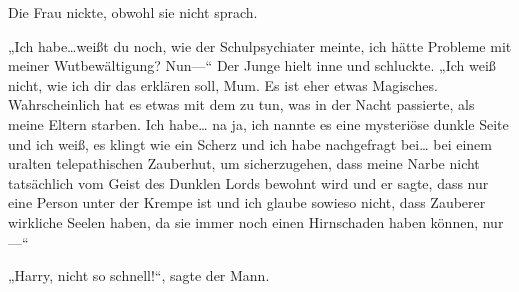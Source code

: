 Die Frau nickte, obwohl sie nicht sprach.

„Ich habe…weißt du noch, wie der Schulpsychiater meinte, ich hätte Probleme mit meiner Wutbewältigung? Nun—“ Der Junge hielt inne und schluckte. „Ich weiß nicht, wie ich dir das erklären soll, Mum. Es ist eher etwas Magisches. Wahrscheinlich hat es etwas mit dem zu tun, was in der Nacht passierte, als meine Eltern starben. Ich habe… na ja, ich nannte es eine mysteriöse dunkle Seite und ich weiß, es klingt wie ein Scherz und ich habe nachgefragt bei… bei einem uralten telepathischen Zauberhut, um sicherzugehen, dass meine Narbe nicht tatsächlich vom Geist des Dunklen Lords bewohnt wird und er sagte, dass nur eine Person unter der Krempe ist und ich glaube sowieso nicht, dass Zauberer wirkliche Seelen haben, da sie immer noch einen Hirnschaden haben können, nur—“

„Harry, nicht so schnell!“, sagte der Mann.

